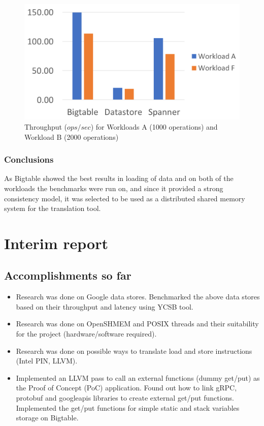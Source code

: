 \documentclass[bsc,frontabs,twoside,singlespacing,parskip,deptreport]{infthesis}     %
\begin{document}
\begin{figure}[!ht]
	\centering
	\includegraphics[width=12cm]{throughput}
	\caption{Throughput (\(ops/sec\)) for Workloads A (1000 operations) and Workload B (2000 operations)}
	\label{throughput}
\end{figure}

\subsection{Conclusions}

As Bigtable showed the best results in loading of data and on both of the workloads the benchmarks were run on, and since it provided a strong consistency model, it was selected to be used as a distributed shared memory system for the translation tool.


\chapter{Interim report}

\section{Accomplishments so far}

\begin{itemize}
\item
Research was done on Google data stores. Benchmarked the above data stores based on their throughput and latency using YCSB tool.
\item
Research was done on OpenSHMEM and POSIX threads and their suitability for the project (hardware/software required).
\item
Research was done on possible ways to translate load and store instructions (Intel PIN, LLVM).
\item
Implemented an LLVM pass to call an external functions (dummy get/put) as the Proof of Concept (PoC) application. Found out how to link gRPC, protobuf and googleapis libraries to create external get/put functions. Implemented the get/put functions for simple static and stack variables storage on Bigtable.
\end{itemize}
\end{document}
